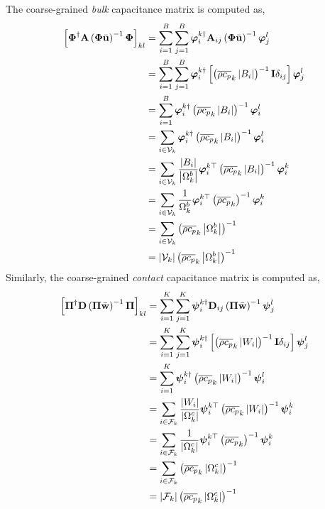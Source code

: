 \begin{tcolorbox}[enhanced, breakable, title=Coarse-Grained Capacitance Matrices]
    The coarse-grained \emph{bulk} capacitance matrix is computed as,
    \begin{subequations}
        \begin{align}
            \left[\boldsymbol{\Phi}^{\dagger}\mathbf{A}\left(\boldsymbol{\Phi}\bar{\mathbf{u}}\right)^{-1}\boldsymbol{\Phi}\right]_{kl} &= \sum_{i=1}^{B}\sum_{j=1}^{B}\boldsymbol{\varphi}_i^{k\dagger}\mathbf{A}_{ij}\left(\boldsymbol{\Phi}\bar{\mathbf{u}}\right)^{-1}\boldsymbol{\varphi}_j^{l}\\
            &= \sum_{i=1}^{B}\sum_{j=1}^{B}\boldsymbol{\varphi}_i^{k\dagger}\left[\left(\overline{\rho c_p}_k\left|B_i\right|\right)^{-1}\mathbf{I}\delta_{ij}\right]\boldsymbol{\varphi}_j^l\\
            &= \sum_{i=1}^{B}\boldsymbol{\varphi}_i^{k\dagger}\left(\overline{\rho c_p}_k\left|B_i\right|\right)^{-1}\boldsymbol{\varphi}_i^l\\
            &= \sum_{i\in\mathcal{V}_k}\boldsymbol{\varphi}_i^{k\dagger}\left(\overline{\rho c_p}_k\left|B_i\right|\right)^{-1}\boldsymbol{\varphi}_i^l\\
            &=\sum_{i\in\mathcal{V}_k}\frac{\left|B_i\right|}{\left|\Omega_k^b\right|}\boldsymbol{\varphi}_i^{k\top}\left(\overline{\rho c_p}_k\left|B_i\right|\right)^{-1}\boldsymbol{\varphi}_i^k\\
            &= \sum_{i\in\mathcal{V}_k}\frac{1}{\Omega_k^b}\boldsymbol{\varphi}_i^{k\top}\left(\overline{\rho c_p}_k\right)^{-1}\boldsymbol{\varphi}_i^k\\
            &= \sum_{i\in\mathcal{V}_k}\left(\overline{\rho c_p}_k\left|\Omega_k^b\right|\right)^{-1}\\
            &= \left|\mathcal{V}_k\right|\left(\overline{\rho c_p}_k\left|\Omega_k^b\right|\right)^{-1}
        \end{align}
    \end{subequations}
    Similarly, the coarse-grained \emph{contact} capacitance matrix is computed as,
    \begin{subequations}
        \begin{align}
            \left[\boldsymbol{\Pi}^{\dagger}\mathbf{D}\left(\boldsymbol{\Pi}\bar{\mathbf{w}}\right)^{-1}\boldsymbol{\Pi}\right]_{kl} &= \sum_{i=1}^{K}\sum_{j=1}^{K}\boldsymbol{\psi}_i^{k\dagger}\mathbf{D}_{ij}\left(\boldsymbol{\Pi}\bar{\mathbf{w}}\right)^{-1}\boldsymbol{\psi}_j^{l}\\
            &= \sum_{i=1}^{K}\sum_{j=1}^{K}\boldsymbol{\psi}_i^{k\dagger}\left[\left(\overline{\rho c_p}_k\left|W_i\right|\right)^{-1}\mathbf{I}\delta_{ij}\right]\boldsymbol{\psi}_j^l\\
            &= \sum_{i=1}^{K}\boldsymbol{\psi}_i^{k\dagger}\left(\overline{\rho c_p}_k\left|W_i\right|\right)^{-1}\boldsymbol{\psi}_i^l\\
            &= \sum_{i\in\mathcal{F}_k}\frac{\left|W_i\right|}{\left|\Omega_k^c\right|}\boldsymbol{\psi}_i^{k\top}\left(\overline{\rho c_p}_k\left|W_i\right|\right)^{-1}\boldsymbol{\psi}_i^k\\
            &= \sum_{i\in\mathcal{F}_k}\frac{1}{\left|\Omega_k^c\right|}\boldsymbol{\psi}_i^{k\top}\left(\overline{\rho c_p}_k\right)^{-1}\boldsymbol{\psi}_i^k\\
            &= \sum_{i\in\mathcal{F}_k}\left(\overline{\rho c_p}_k\left|\Omega_k^c\right|\right)^{-1}\\
            &= \left|\mathcal{F}_k\right|\left(\overline{\rho c_p}_k\left|\Omega_k^c\right|\right)^{-1}
        \end{align}
    \end{subequations}
\end{tcolorbox}
